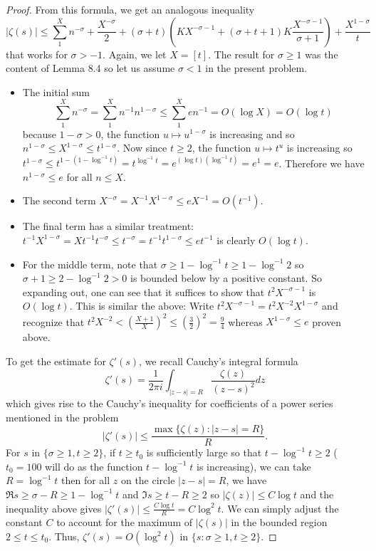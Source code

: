 \documentclass[12pt]{article}
\begin{document}
\begin{proof}
From this formula, we get an analogous inequality
$$|\zeta(s)| \leq \sum_1^X n^{-\sigma} + \frac{X^{-\sigma}}{2} + (\sigma + t) \left(K X^{-\sigma-1} + (\sigma + t + 1) K \frac{X^{-\sigma-1}}{\sigma+1} \right) + \frac{X^{1-\sigma}}{t}$$
that works for $\sigma > -1$. Again, we let $X = [t]$. The result for $\sigma \geq 1$ was the content of Lemma 8.4 so let us assume $\sigma < 1$ in the present problem.
\begin{itemize}
\item The initial sum
$$\sum_1^X n^{-\sigma} = \sum_1^X n^{-1} n^{1-\sigma} \leq \sum_1^X e n^{-1} = O(\log X) = O(\log t)$$
because $1 - \sigma > 0$, the function $u \mapsto u^{1-\sigma}$ is increasing and so $n^{1-\sigma} \leq X^{1-\sigma} \leq t^{1-\sigma}$. Now since $t \geq 2$, the function $u \mapsto t^u$ is increasing so $t^{1-\sigma} \leq t^{1-(1 - \log^{-1} t)} = t^{\log^{-1} t} = e^{(\log t)(\log^{-1} t)} = e^1 = e$. Therefore we have $n^{1-\sigma} \leq e$ for all $n \leq X$.

\item The second term $X^{-\sigma} = X^{-1} X^{1-\sigma} \leq e X^{-1} = O(t^{-1})$.

\item The final term has a similar treatment: $t^{-1} X^{1-\sigma} = X t^{-1} t^{-\sigma} \leq t^{-\sigma} = t^{-1} t^{1-\sigma} \leq e t^{-1}$ is clearly $O(\log t)$.

\item For the middle term, note that $\sigma \geq 1 - \log^{-1} t \geq 1 - \log^{-1} 2$ so $\sigma + 1 \geq 2 - \log^{-1} 2 > 0$ is bounded below by a positive constant. So expanding out, one can see that it suffices to show that $t^2 X^{-\sigma-1}$ is $O(\log t)$. This is similar the above: Write $t^2 X^{-\sigma-1} = t^2 X^{-2} X^{1-\sigma}$ and recognize that $t^2 X^{-2} < \left(\frac{X+1}{X}\right)^2 \leq \left(\frac{3}{2}\right)^2 = \frac{9}{4}$ whereas $X^{1-\sigma} \leq e$ proven above.
\end{itemize}

To get the estimate for $\zeta'(s)$, we recall Cauchy's integral formula
$$\zeta'(s) = \frac{1}{2 \pi i} \int_{|z - s| = R} \frac{\zeta(z)}{(z - s)^2} dz$$
which gives rise to the Cauchy's inequality for coefficients of a power series mentioned in the problem
$$|\zeta'(s)| \leq \frac{\max\{\zeta(z) : |z - s| = R\}}{R}.$$
For $s$ in $\{\sigma \geq 1, t \geq 2\}$, if $t \geq t_0$ is sufficiently large so that $t - \log^{-1} t \geq 2$ ($t_0 = 100$ will do as the function $t - \log^{-1} t$ is increasing), we can take $R = \log^{-1} t$ then for all $z$ on the circle $|z - s| = R$, we have $\Re s \geq \sigma - R \geq 1 - \log^{-1} t$ and $\Im s \geq t - R \geq 2$ so $|\zeta(z)| \leq C \log t$ and the inequality above gives $|\zeta'(s)| \leq \frac{C \log t}{R} = C \log^2 t$. We can simply adjust the constant $C$ to account for the maximum of $|\zeta(s)|$ in the bounded region $2 \leq t \leq t_0$. Thus, $\zeta'(s) = O(\log^2 t)$ in $\{s : \sigma \geq 1, t \geq 2\}$.
\end{proof}
\end{document}

